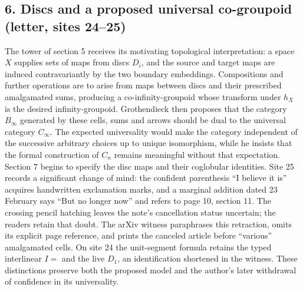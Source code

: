 \subsection*{6. Discs and a proposed universal co-groupoid (letter, sites 24--25)}
The tower of section 5 receives its motivating topological interpretation: a space $X$ supplies sets of maps from discs $D_i$, and the source and target maps are induced contravariantly by the two boundary embeddings. Compositions and further operations are to arise from maps between discs and their prescribed amalgamated sums, producing a co-infinity-groupoid whose transform under $h_X$ is the desired infinity-groupoid. Grothendieck then proposes that the category $B_\infty$ generated by these cells, sums and arrows should be dual to the universal category $C_\infty$. The expected universality would make the category independent of the successive arbitrary choices up to unique isomorphism, while he insists that the formal construction of $C_n$ remains meaningful without that expectation. Section 7 begins to specify the disc maps and their coglobular identities. Site 25 records a significant change of mind: the confident parenthesis ``I believe it is'' acquires handwritten exclamation marks, and a marginal addition dated 23 February says ``But no longer now'' and refers to page 10, section 11. The crossing pencil hatching leaves the note's cancellation status uncertain; the readers retain that doubt. The arXiv witness paraphrases this retraction, omits its explicit page reference, and prints the canceled article before ``various'' amalgamated cells. On site 24 the unit-segment formula retains the typed interlinear $I=$ and the live $D_1$, an identification shortened in the witness. These distinctions preserve both the proposed model and the author's later withdrawal of confidence in its universality.

